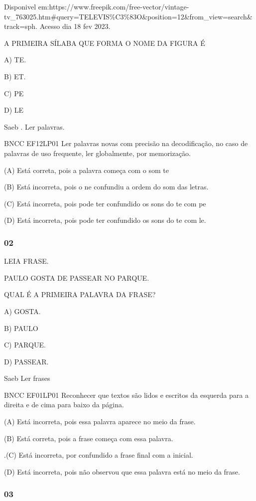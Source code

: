 \begin{escola}
Disponivel
em:https://www.freepik.com/free-vector/vintage-tv\_763025.htm\#query=TELEVIS\%C3\%83O\&position=12\&from\_view=search\&track=sph.
Acesso dia 18 fev 2023.

A PRIMEIRA SÍLABA QUE FORMA O NOME DA FIGURA É

A) TE.

B) ET.

C) PE

D) LE

Saeb . Ler palavras.

BNCC EF12LP01 Ler palavras novas com precisão na decodificação, no caso
de palavras de uso frequente, ler globalmente, por memorização.

(A) Está correta, pois a palavra começa com o som te

(B) Está incorreta, pois o ne confundiu a ordem do som das letras.

\protect\hypertarget{_heading=h.3rdcrjn}{}{}(C) Está incorreta, pois
pode ter confundido os sons do te com pe

(D) Está incorreta, pois pode ter confundido os sons do te com le.

\subsubsection{02 }\label{section-5}

LEIA FRASE.

PAULO GOSTA DE PASSEAR NO PARQUE.

QUAL É A PRIMEIRA PALAVRA DA FRASE?

A) GOSTA.

B) PAULO

C) PARQUE.

D) PASSEAR.

Saeb Ler frases

BNCC EF01LP01 Reconhecer que textos são lidos e escritos da esquerda
para a direita e de cima para baixo da página.

(A) Está incorreta, pois essa palavra aparece no meio da frase.

(B) Está correta, pois a frase começa com essa palavra.

.(C) Está incorreta, por confundido a frase final com a inicial.

(D) Está incorreta, pois não observou que essa palavra está no meio da
frase.

\subsubsection{03 }\label{section-6}


\end{escola}
